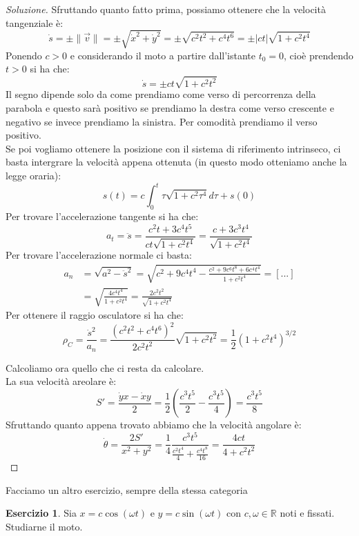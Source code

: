 \documentclass[11pt,a4paper,twoside]{article}
\theoremstyle{definition}
\newtheorem{ese}{Esercizio}[section]
\newenvironment{sol}
	{\renewcommand\qedsymbol{$\blacksquare$}\begin{proof}[Soluzione]}
	{\end{proof}}
\begin{document}
\begin{sol}
	Sfruttando quanto fatto prima, possiamo ottenere che la velocità tangenziale è:
	\[ \dot s = \pm \| \vec v\| = \pm \sqrt{\dot x^2 + \dot y^2}  = \pm \sqrt{c^2t^2 + c^4t^6} = \pm |ct|\sqrt{1 + c^2t^4}\]
	Ponendo $c>0$ e considerando il moto a partire dall'istante $t_0 = 0$, cioè prendendo $t>0$ si ha che:
	\[ \dot s = \pm ct \sqrt{1 + c^2t^2} \]
	Il segno dipende solo da come prendiamo come verso di percorrenza della parabola e questo sarà positivo se prendiamo la destra come verso crescente e negativo se invece prendiamo la sinistra.
	Per comodità prendiamo il verso positivo.\\
	Se poi vogliamo ottenere la posizione con il sistema di riferimento intrinseco, ci basta intergrare la velocità appena ottenuta (in questo modo otteniamo anche la legge oraria):
	\[ s(t) = c \int_0^t \tau \sqrt{1 + c^2 \tau^4}d\tau + s(0) \]
	Per trovare l'accelerazione tangente si ha che:
	\[ a_t = \ddot s = \frac{c^2 t + 3c^4t^5}{ct \sqrt{1 + c^2t^4}} = \frac{c + 3c^3t^4}{\sqrt{1 + c^2t^4}} \]
	Per trovare l'accelerazione normale ci basta:
	\begin{align*}
		a_n &= \sqrt{a^2 - \ddot s^2} = \sqrt{c^2 + 9c^4t^4 - \frac{c^2 + 9c^6t^8 + 6c^4t^4}{1 + c^2t^4}} = [...]\\
			&= \sqrt{\frac{4c^4t^4}{1 + c^2t^4}} = \frac{2c^2t^2}{\sqrt{1 + c^2 t^4}}
	\end{align*}
	Per ottenere il raggio osculatore si ha che:
	\[\rho_C = \frac{\dot s^2}{a_n} = \frac{(c^2t^2 + c^4t^6)^2}{2c^2t^2}\sqrt{1 + c^2t^2} = \frac 12 (1 + c^2t^4)^{3/2}\]

	Calcoliamo ora quello che ci resta da calcolare.\\
	La sua velocità areolare è:
	\[ S'= \frac{\dot y x - \dot xy}{2} = \frac 12 \left( \frac{c^3t^5}2 - \frac{c^3t^5}{4} \right) = \frac{c^3t^5}8 \]
	Sfruttando quanto appena trovato abbiamo che la velocità angolare è:
	\[ \dot \theta = \frac{2S'}{x^2 +y^2}=\frac 14 \frac{c^3t^5}{\frac{c^2t^4}4 + \frac{c^4t^8}{16}}  = \frac{4ct}{4+c^2t^2}\]
\end{sol}

Facciamo un altro esercizio, sempre della stessa categoria

\begin{ese}
	Sia $x = c \cos(\omega t)$ e $y = c \sin(\omega t)$ con $c, \omega \in \mathbb R$ noti e fissati. Studiarne il moto.
\end{ese}
\end{document}
